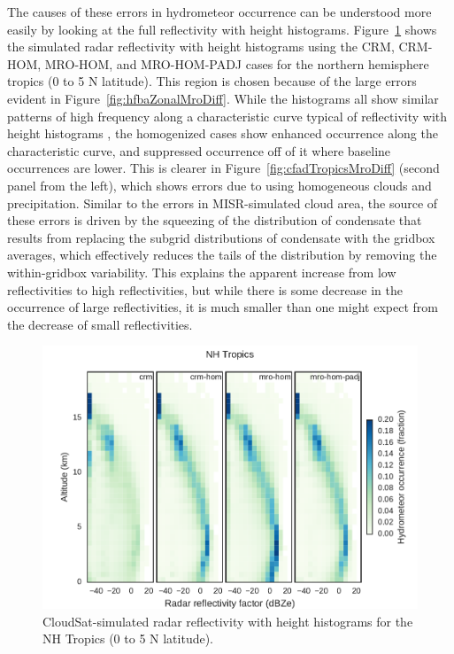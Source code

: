 The causes of these errors in hydrometeor occurrence can be understood
more easily by looking at the full reflectivity with height histograms.
Figure~\ref{fig:cfadTropicsMro} shows the simulated radar reflectivity
with height histograms using the CRM, CRM-HOM, MRO-HOM, and MRO-HOM-PADJ
cases for the northern hemisphere tropics (0 to 5 N latitude). This
region is chosen because of the large errors evident in
Figure~\ref{fig:hfbaZonalMroDiff}. While the histograms all show similar
patterns of high frequency along a characteristic curve typical of
reflectivity with height histograms
\citep[e.g.,][]{marchand_et_al_2009}, the homogenized cases show
enhanced occurrence along the characteristic curve, and suppressed
occurrence off of it where baseline occurrences are lower. This is
clearer in Figure~\ref{fig:cfadTropicsMroDiff} (second panel from the
left), which shows errors due to using homogeneous clouds and
precipitation. Similar to the errors in MISR-simulated cloud area, the
source of these errors is driven by the squeezing of the distribution of
condensate that results from replacing the subgrid distributions of
condensate with the gridbox averages, which effectively reduces the
tails of the distribution by removing the within-gridbox variability.
This explains the apparent increase from low reflectivities to high
reflectivities, but while there is some decrease in the occurrence of
large reflectivities, it is much smaller than one might expect from the
decrease of small reflectivities.

\begin{figure}[htbp]
\centering
\includegraphics{graphics/subgrid1_cfadDbze94_NHTropics.pdf}
\caption{\label{fig:cfadTropicsMro}CloudSat-simulated radar reflectivity
with height histograms for the NH Tropics (0 to 5 N
latitude).}\label{fig:cfadTropicsMro}
\end{figure}

